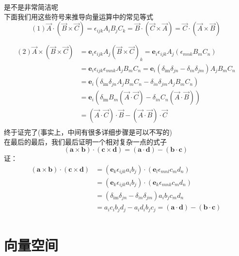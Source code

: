 \documentclass{article}
\newcommand{\ve}{\boldsymbol}
\begin{document}
\begin{CJK}{UTF8}{gkai}
是不是非常简洁呢\\

下面我们用这些符号来推导向量运算中的常见等式\\
\[(1)\overrightarrow{A}\cdot(\overrightarrow{B}\times \overrightarrow{C})=\epsilon_{ijk}A_i B_j C_k=\overrightarrow{B}\cdot(\overrightarrow{C}\times \overrightarrow{A})=\overrightarrow{C}\cdot(\overrightarrow{A}\times \overrightarrow{B})\]

\[
\begin{aligned}    
(2)\overrightarrow{A}\times(\overrightarrow{B}\times \overrightarrow{C})&=\ve{e}_i \epsilon_{ijk}A_j (\overrightarrow{B}\times \overrightarrow{C})_k =\ve{e}_i \epsilon_{ijk}A_j (\epsilon_{mnk}B_m C_n) \\
&=\ve{e}_i\epsilon_{ijk}\epsilon_{mnk}A_j B_m C_n =\ve{e}_i(\delta_{\text{im}}\delta_{jn}-\delta_{in}\delta_{jm})A_j B_m C_n\\
&=\ve{e}_i(\delta_{\text{im}}\delta_{jn}A_j B_m C_n-\delta_{in}\delta_{jm}A_j B_m C_n)\\
&=\ve{e}_i(\delta_{\text{im}}B_m(\overrightarrow{A}\cdot\overrightarrow{C})-\delta_{in}C_n(\overrightarrow{A}\cdot\overrightarrow{B}))\\
&=(\overrightarrow{A}\cdot\overrightarrow{C})\cdot\overrightarrow{B}-(\overrightarrow{A}\cdot\overrightarrow{B})\cdot\overrightarrow{C}\\
\end{aligned}
\]
终于证完了(事实上，中间有很多详细步骤是可以不写的)\\

在最后的最后，我们最后证明一个相对复杂一点的式子
\[(\ve{a}\times\ve{b})\cdot(\ve{c}\times\ve{d})=(\ve{a}\cdot\ve{d})-(\ve{b}\cdot\ve{c})\]
证：
\[
\begin{aligned}    
(\ve{a}\times\ve{b})\cdot(\ve{c}\times\ve{d})&=(\ve{e}_k\epsilon_{ijk}a_i b_j)\cdot (\ve{e}_l\epsilon_{mnl} c_m d_n)\\
&=(\ve{e}_k\epsilon_{ijk}a_i b_j)\cdot (\ve{e}_k\epsilon_{mnk} c_m d_n)\\
&=(\delta_{\text{im}}\delta_{jn}-\delta_{in}\delta_{jm})a_i b_j c_m d_n\\
&=a_i c_i b_j d_j- a_i d_i b_j c_j=(\ve{a}\cdot\ve{d})-(\ve{b}\cdot\ve{c})\\
\end{aligned}
\]

\newpage
\section{向量空间}

\end{CJK}
\end{document}
